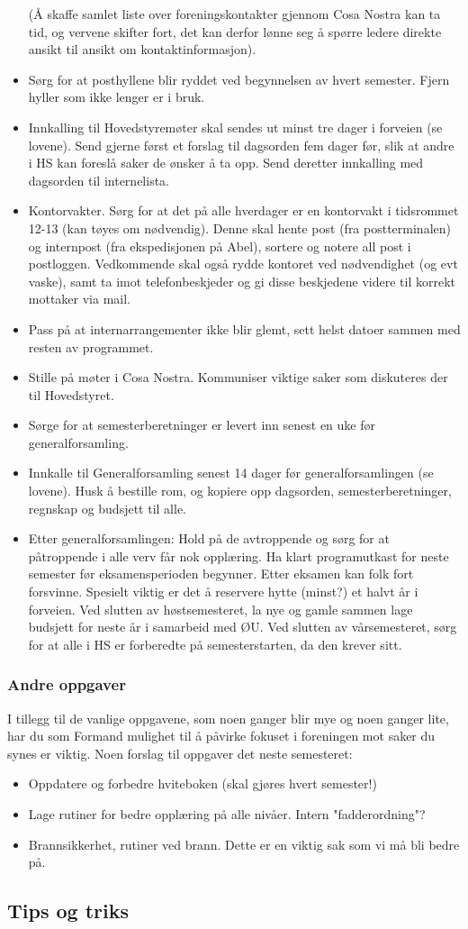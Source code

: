 \begin{itemize}
	(Å skaffe samlet liste over foreningskontakter gjennom Cosa Nostra kan ta tid, og vervene skifter fort,
	det kan derfor lønne seg å spørre ledere direkte ansikt til ansikt om kontaktinformasjon).
\item Sørg for at posthyllene blir ryddet ved begynnelsen av hvert semester. Fjern hyller som ikke lenger er i bruk.
\item Innkalling til Hovedstyremøter skal sendes ut minst tre dager i forveien (se lovene).
	Send gjerne først et forslag til dagsorden fem dager før, slik at andre i HS kan foreslå saker de ønsker
	å ta opp. Send deretter innkalling med dagsorden til internelista.
\item Kontorvakter. Sørg for at det på alle hverdager er en kontorvakt i tidsrommet 12-13 (kan tøyes om nødvendig).
	Denne skal hente post (fra postterminalen) og internpost (fra ekspedisjonen på Abel), sortere og notere all
	post i postloggen. Vedkommende skal også rydde kontoret ved nødvendighet (og evt vaske), samt ta imot
	telefonbeskjeder og gi disse beskjedene videre til korrekt mottaker via mail.
\item Pass på at internarrangementer ikke blir glemt, sett helst datoer sammen med resten av programmet.
\item Stille på møter i Cosa Nostra. Kommuniser viktige saker som diskuteres der til Hovedstyret.
\item Sørge for at semesterberetninger er levert inn senest en uke før generalforsamling.
\item Innkalle til Generalforsamling senest 14 dager før generalforsamlingen (se lovene).
	Husk å bestille rom, og kopiere opp dagsorden, semesterberetninger, regnskap og budsjett til alle.
\item Etter generalforsamlingen: Hold på de avtroppende og sørg for at påtroppende i alle verv får nok opplæring.
	Ha klart programutkast for neste semester før eksamensperioden begynner. Etter eksamen kan folk fort forsvinne.
	Spesielt viktig er det å reservere hytte (minst?) et halvt år i forveien. Ved slutten av høstsemesteret, la
	nye og gamle sammen lage budsjett for neste år i samarbeid med ØU. Ved slutten av vårsemesteret, sørg for
	at alle i HS er forberedte på semesterstarten, da den krever sitt.
\end{itemize}


\subsubsection{Andre oppgaver}
I tillegg til de vanlige oppgavene, som noen ganger blir mye og noen ganger lite, har du som Formand mulighet
til å påvirke fokuset i foreningen mot saker du synes er viktig. Noen forslag til oppgaver det neste semesteret:
\begin{itemize}
\item Oppdatere og forbedre hviteboken (skal gjøres hvert semester!)
\item Lage rutiner for bedre opplæring på alle nivåer. Intern "fadderordning"?
\item Brannsikkerhet, rutiner ved brann. Dette er en viktig sak som vi må bli bedre på.
\end{itemize}


\subsection{Tips og triks}
